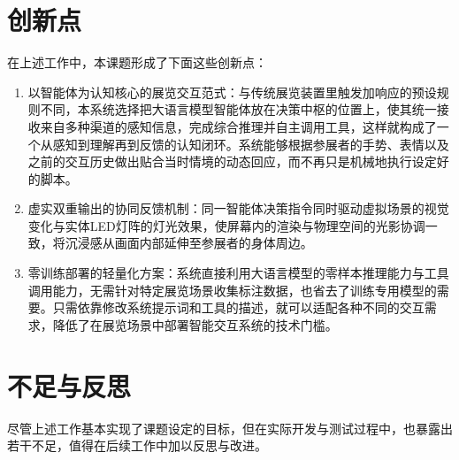 \documentclass[bachelor]{njupthesis}
\begin{document}
\section{创新点}


在上述工作中，本课题形成了下面这些创新点：

\begin{enumerate}

\item 以智能体为认知核心的展览交互范式：与传统展览装置里触发加响应的预设规则不同，本系统选择把大语言模型智能体放在决策中枢的位置上，使其统一接收来自多种渠道的感知信息，完成综合推理并自主调用工具，这样就构成了一个从感知到理解再到反馈的认知闭环。系统能够根据参展者的手势、表情以及之前的交互历史做出贴合当时情境的动态回应，而不再只是机械地执行设定好的脚本。

\item 虚实双重输出的协同反馈机制：同一智能体决策指令同时驱动虚拟场景的视觉变化与实体LED灯阵的灯光效果，使屏幕内的渲染与物理空间的光影协调一致，将沉浸感从画面内部延伸至参展者的身体周边。

\item 零训练部署的轻量化方案：系统直接利用大语言模型的零样本推理能力与工具调用能力，无需针对特定展览场景收集标注数据，也省去了训练专用模型的需要。只需依靠修改系统提示词和工具的描述，就可以适配各种不同的交互需求，降低了在展览场景中部署智能交互系统的技术门槛。

\end{enumerate}


\section{不足与反思}


尽管上述工作基本实现了课题设定的目标，但在实际开发与测试过程中，也暴露出若干不足，值得在后续工作中加以反思与改进。
\end{document}
